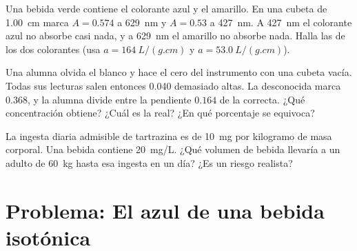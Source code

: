 \begin{exercise}[$\star\star\star$]\label{exo:g11:absorbance:13}
Una bebida verde contiene el colorante azul y el amarillo. En una cubeta
de \qty{1.00}{cm} marca $A = 0.574$ a \qty{629}{nm} y $A = 0.53$ a
\qty{427}{nm}. A \qty{427}{nm} el colorante azul no absorbe casi nada, y
a \qty{629}{nm} el amarillo no absorbe nada. Halla las  de los dos colorantes (usa $a = \qty{164}{L/(g.cm)}$ y
$a = \qty{53.0}{L/(g.cm)}$).
\end{exercise}

\begin{exercise}[$\star\star\star$]\label{exo:g11:absorbance:14}
Una alumna olvida el blanco y hace el cero del instrumento con una
cubeta vacía. Todas sus lecturas salen entonces \num{0.040} demasiado
altas. La desconocida marca $0.368$, y la alumna divide entre la
pendiente $0.164$ de la  correcta. ¿Qué concentración
obtiene? ¿Cuál es la real? ¿En qué porcentaje se equivoca?
\end{exercise}

\begin{exercise}[$\star\star\star$]\label{exo:g11:absorbance:15}
La ingesta diaria admisible de tartrazina es de \qty{10}{mg} por
kilogramo de masa corporal. Una bebida contiene \qty{20}{mg/L}. ¿Qué
volumen de bebida llevaría a un adulto de \qty{60}{kg} hasta esa ingesta
en un día? ¿Es un riesgo realista?
\end{exercise}

\section{Problema: El azul de una bebida isotónica}



